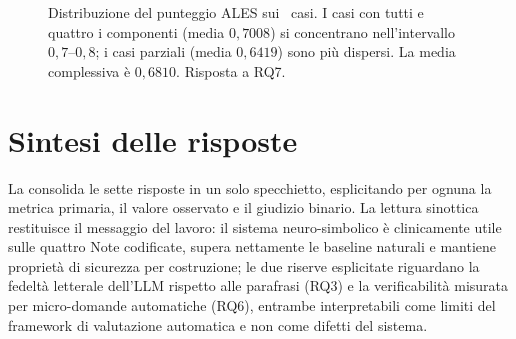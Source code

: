 \begin{figure}[t]
  \centering
  \caption{Distribuzione del punteggio ALES sui \goldn\ casi. I casi con tutti e quattro i componenti (media $0{,}7008$) si concentrano nell'intervallo $0{,}7$--$0{,}8$; i casi parziali (media $0{,}6419$) sono più dispersi. La media complessiva è $0{,}6810$. Risposta a RQ7.}
  \label{fig:ales-dist}
\end{figure}

\section{Sintesi delle risposte}
\label{sec:sintesi-rq}

La  consolida le sette risposte in un solo specchietto, esplicitando per ognuna la metrica primaria, il valore osservato e il giudizio binario. La lettura sinottica restituisce il messaggio del lavoro: il sistema neuro-simbolico è clinicamente utile sulle quattro Note codificate, supera nettamente le baseline naturali e mantiene proprietà di sicurezza per costruzione; le due riserve esplicitate riguardano la fedeltà letterale dell'LLM rispetto alle parafrasi (RQ3) e la verificabilità misurata per micro-domande automatiche (RQ6), entrambe interpretabili come limiti del framework di valutazione automatica e non come difetti del sistema.

